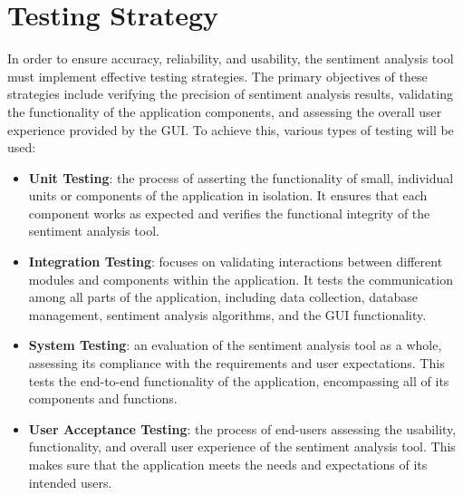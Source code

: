 \section{Testing Strategy}
In order to ensure accuracy, reliability, and usability, the sentiment analysis tool must implement effective testing strategies. The primary objectives of these strategies include verifying the precision of sentiment analysis results, validating the functionality of the application components, and assessing the overall user experience provided by the GUI. To achieve this, various types of testing will be used:

\begin{itemize}
    \item \textbf{Unit Testing}: the process of asserting the functionality of small, individual units or components of the application in isolation. It ensures that each component works as expected and verifies the functional integrity of the sentiment analysis tool.
    \item \textbf{Integration Testing}: focuses on validating interactions between different modules and components within the application. It tests the communication among all parts of the application, including data collection, database management, sentiment analysis algorithms, and the GUI functionality.
    \item \textbf{System Testing}: an evaluation of the sentiment analysis tool as a whole, assessing its compliance with the requirements and user expectations. This tests the end-to-end functionality of the application, encompassing all of its components and functions.
    \item \textbf{User Acceptance Testing}: the process of end-users assessing the usability, functionality, and overall user experience of the sentiment analysis tool. This makes sure that the application meets the needs and expectations of its intended users.
\end{itemize}